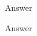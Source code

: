 \documentclass[11pt]{article}
\begin{document}
\begin{enumerate}
	
	Answer
	


	Answer
\end{enumerate}
\end{document}
